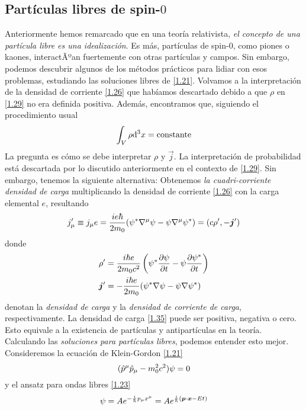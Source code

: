 \subsection{Partículas libres de spin-$0$}
Anteriormente hemos remarcado que en una teoría relativista,\textit{ el concepto de una partícula libre es una idealización}. Es más, partículas de spin-$0$, como piones o kaones, interactÃºan fuertemente con otras partículas y campos. Sin embargo, podemos descubrir algunos de los métodos prácticos para lidiar con esos problemas, estudiando las soluciones libres de \eqref{1.21}. Volvamos a la interpretación de la densidad de corriente \eqref{1.26} que habíamos descartado debido a que $\rho$ en \eqref{1.29} no era definida positiva. Además, encontramos que, siguiendo el procedimiento usual
\begin{equation}
  \int_V\rho\dd^3x=\rm constante
\end{equation}
La pregunta es cómo se debe interpretar $\rho$ y $\vec{j}$. La interpretación de probabilidad está descartada por lo discutido anteriormente en el contexto de \eqref{1.29}. Sin embargo, tenemos la siguiente alternativa: Obtenemos \textit{la cuadri-corriente densidad de carga} multiplicando la densidad de corriente \eqref{1.26} con la carga elemental $e$, resultando
\begin{align}
  j_\mu '\equiv j_\mu e=\frac{i e\hbar}{2m_0}(\psi^*\nabla^\mu \psi-\psi\nabla^\mu \psi^*)=(c\rho',-\vb*{j}')
\end{align}
donde
\begin{align}
 \label{1.35} \rho'&=\frac{i\hbar e}{2m_0c^2}\left(\psi^*\pdv{\psi}{t}-\psi\pdv{\psi^*}{t}\right)\\
  \vb*{j}'&=-\frac{i\hbar e}{2m_0}(\psi^*\nabla \psi-\psi\nabla\psi^*)\label{1.36}
\end{align}
denotan la \textit{densidad de carga} y la \textit{densidad de corriente de carga}, respectivamente. La densidad de carga \eqref{1.35} puede ser positiva, negativa o cero. Esto equivale a la existencia de partículas y antipartículas en la teoría. Calculando las \textit{soluciones para partículas libres}, podemos entender esto mejor. Consideremos la ecuación de Klein-Gordon \eqref{1.21}
\begin{equation}
  (\hat{p}^\mu \hat{p}_\mu -m_0^2c^2)\psi=0
\end{equation}
y el ansatz para ondas libres \eqref{1.23}
\begin{equation}
  \psi=Ae^{-\frac{i}{\hbar}p_\mu x^\mu }=Ae^{\frac{i}{\hbar}(\vb*{p}\cdot\vb*{x}-Et)}
\end{equation}
